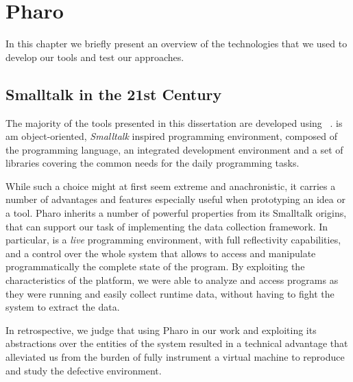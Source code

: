 
\chapter{Pharo}\label{ch:pharo}

In this chapter we briefly present an overview of the technologies that we used to develop our tools and test our approaches.


\section{Smalltalk in the 21st Century}

The majority of the tools presented in this dissertation are developed using \pha~\cite{black2009}.
\pha is am object-oriented, \textit{Smalltalk} inspired programming environment, composed of the \pha programming language, an integrated development environment and a set of libraries covering the common needs for the daily programming tasks.

While such a choice might at first seem extreme and anachronistic, it carries a number of advantages and features especially useful when prototyping an idea or a tool.
Pharo inherits a number of powerful properties from its Smalltalk origins, that can support our task of implementing the data collection framework.
In particular, \pha is a \emph{live} programming environment, with full reflectivity capabilities, and a control over the whole system that allows to access and manipulate programmatically the complete state of the program.
By exploiting the characteristics of the platform, we were able to analyze and access programs as they were running and easily collect runtime data, without having to fight the system to extract the data.

In retrospective, we judge that using Pharo in our work and exploiting its abstractions over the entities of the system resulted in a technical advantage that alleviated us from the burden of fully instrument a virtual machine to reproduce and study the defective environment.


